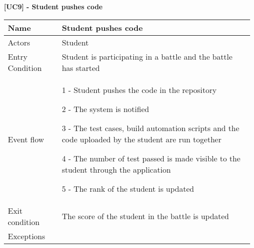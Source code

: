     \begin{table}[h]
    \textbf{[UC9] - Student pushes code }

    
      \centering
      \begin{tabular}{|p{3cm}|p{14cm}|}
        \hline
        Name & Student pushes code \\
        \hline
        Actors & Student \\
        \hline
        Entry Condition &  Student is participating in a battle and the battle has started \\
        \hline
        Event flow &  1 - Student pushes the code in the repository
        
        2 - The system is notified

        3 - The test cases, build automation scripts and the code uploaded by the student are run together

        4 - The number of test passed is made visible to the student through the application

        5 - The rank of the student is updated\\
        \hline
        Exit condition &  The score of the student in the battle is updated \\
        \hline
        Exceptions & 
        \\
        \hline
      \end{tabular}
      
    \end{table}

